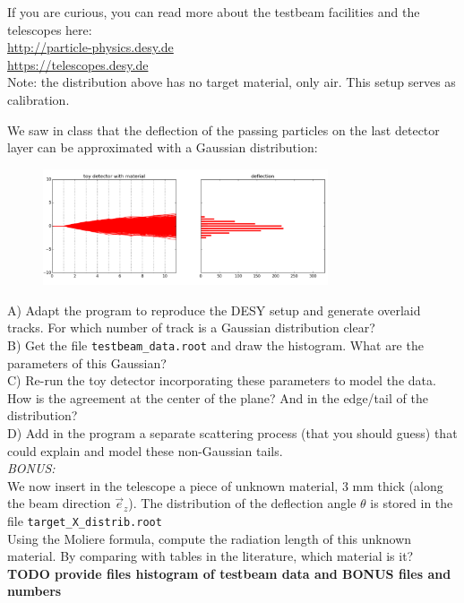 \documentclass[12pt]{article}
\begin{document}
If you are curious, you can read more about the testbeam facilities and the telescopes here:\\
\hspace{10ex} \href{http://particle-physics.desy.de}{http://particle-physics.desy.de}\\[1ex]
\hspace{10ex} \href{https://telescopes.desy.de}{https://telescopes.desy.de}\\[1ex]

Note: the distribution above has no target material, only air. This setup serves as calibration.

We saw in class that the deflection of the passing particles on the last detector layer can be approximated with a Gaussian distribution:

\begin{figure}[h]
    \centering
    \includegraphics[width=0.75\textwidth]{toy_det_deflection.png}
\end{figure}

A) Adapt the program to reproduce the DESY setup and generate overlaid tracks. For which number of track is a Gaussian distribution clear?\\[1ex]

B) Get the file {\tt{testbeam\_data.root}} and draw the histogram. What are the parameters of this Gaussian?\\[1ex]

C) Re-run the toy detector incorporating these parameters to model the data. How is the agreement at the center of the plane? And in the edge/tail of the distribution?\\[1ex]

D) Add in the program a separate scattering process (that you should guess) that could explain and model these non-Gaussian tails.\\[1ex]

\vspace{1ex}
\textit{BONUS:}\\
We now insert in the telescope a piece of unknown material, 3 mm thick (along the beam direction $\vec{e}_z$). The distribution of the deflection angle $\theta$ is stored in the file {\tt{target\_X\_distrib.root}}\\[1ex]
Using the Moliere formula, compute the radiation length of this unknown material. By comparing with tables in the literature, which material is it?\\
{\color{red}\textbf{TODO provide files histogram of testbeam data and BONUS files and numbers}}
\end{document}
